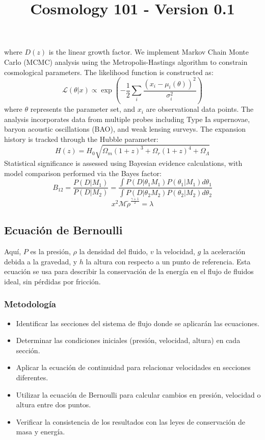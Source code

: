 \documentclass{article}\usepackage{graphicx} \usepackage{amsmath} \usepackage{colortbl}\title{Cosmology 101 - Version 0.1}
\begin{document}
where $D(z)$ is the linear growth factor. We implement Markov Chain Monte Carlo (MCMC) analysis using the Metropolis-Hastings algorithm to constrain cosmological parameters. The likelihood function is constructed as:  
\begin{equation} 
\mathcal{L}(\theta|x) \propto \exp\left(-\frac{1}{2}\sum_i \frac{(x_i - \mu_i(\theta))^2}{\sigma_i^2}\right) 
\end{equation}  
where $\theta$ represents the parameter set, and $x_i$ are observational data points. The analysis incorporates data from multiple probes including Type Ia supernovae, baryon acoustic oscillations (BAO), and weak lensing surveys. The expansion history is tracked through the Hubble parameter:  
\begin{equation} H(z) = H_0\sqrt{\Omega_m(1+z)^3 + \Omega_r(1+z)^4 + \Omega_\Lambda} 
\end{equation}  
Statistical significance is assessed using Bayesian evidence calculations, with model comparison performed via the Bayes factor:  \begin{equation} B_{12} = \frac{P(D|M_1)}{P(D|M_2)} = \frac{\int P(D|\theta_1 M_1)P(\theta_1|M_1)d\theta_1}{\int P(D|\theta_2 M_2)P(\theta_2|M_2)d\theta_2} 
\end{equation} \begin{equation}x^2 \mathcal{M} \tilde{\rho }^{\frac{\gamma +1}{2}}=\lambda \label{ber1} \end{equation}\subsection{Ecuaci{\'o}n de Bernoulli}
Aquí, $P$ es la presión, $\rho$ la densidad del fluido, $v$ la velocidad, $g$ la aceleración debida a la gravedad, y $h$ la altura con respecto a un punto de referencia. Esta ecuaci{\'o}n se usa para describir la conservación de la energía en el flujo de fluidos ideal, sin pérdidas por fricción.
\subsubsection{Metodolog{\'i}a}
\begin{itemize}
\item Identificar las secciones del sistema de flujo donde se aplicarán las ecuaciones.
\item Determinar las condiciones iniciales (presión, velocidad, altura) en cada sección.
\item Aplicar la ecuación de continuidad para relacionar velocidades en secciones diferentes.
\item Utilizar la ecuación de Bernoulli para calcular cambios en presión, velocidad o altura entre dos puntos.
\item Verificar la consistencia de los resultados con las leyes de conservación de masa y energía.
\end{itemize}
\end{document}
